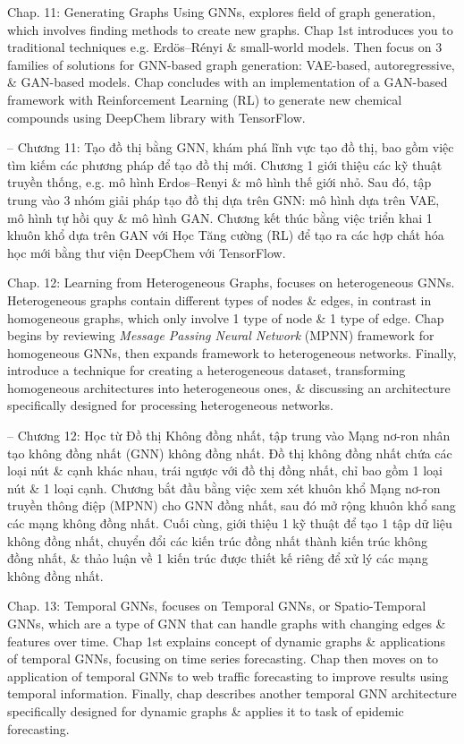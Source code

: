 \documentclass{article}
\begin{document}
\begin{itemize}
\begin{itemize}
        Chap. 11: Generating Graphs Using GNNs, explores field of graph generation, which involves finding methods to create new graphs. Chap 1st introduces you to traditional techniques e.g. Erd\"os--R\'enyi \& small-world models. Then focus on 3 families of solutions for GNN-based graph generation: VAE-based, autoregressive, \& GAN-based models. Chap concludes with an implementation of a GAN-based framework with Reinforcement Learning (RL) to generate new chemical compounds using DeepChem library with TensorFlow.

        -- Chương 11: Tạo đồ thị bằng GNN, khám phá lĩnh vực tạo đồ thị, bao gồm việc tìm kiếm các phương pháp để tạo đồ thị mới. Chương 1 giới thiệu các kỹ thuật truyền thống, e.g. mô hình Erdos--Renyi \& mô hình thế giới nhỏ. Sau đó, tập trung vào 3 nhóm giải pháp tạo đồ thị dựa trên GNN: mô hình dựa trên VAE, mô hình tự hồi quy \& mô hình GAN. Chương kết thúc bằng việc triển khai 1 khuôn khổ dựa trên GAN với Học Tăng cường (RL) để tạo ra các hợp chất hóa học mới bằng thư viện DeepChem với TensorFlow.

        Chap. 12: Learning from Heterogeneous Graphs, focuses on heterogeneous GNNs. Heterogeneous graphs contain different types of nodes \& edges, in contrast in homogeneous graphs, which only involve 1 type of node \& 1 type of edge. Chap begins by reviewing {\it Message Passing Neural Network} (MPNN) framework for homogeneous GNNs, then expands framework to heterogeneous networks. Finally, introduce a technique for creating a heterogeneous dataset, transforming homogeneous architectures into heterogeneous ones, \& discussing an architecture specifically designed for processing heterogeneous networks.

        -- Chương 12: Học từ Đồ thị Không đồng nhất, tập trung vào Mạng nơ-ron nhân tạo không đồng nhất (GNN) không đồng nhất. Đồ thị không đồng nhất chứa các loại nút \& cạnh khác nhau, trái ngược với đồ thị đồng nhất, chỉ bao gồm 1 loại nút \& 1 loại cạnh. Chương bắt đầu bằng việc xem xét khuôn khổ Mạng nơ-ron truyền thông điệp (MPNN) cho GNN đồng nhất, sau đó mở rộng khuôn khổ sang các mạng không đồng nhất. Cuối cùng, giới thiệu 1 kỹ thuật để tạo 1 tập dữ liệu không đồng nhất, chuyển đổi các kiến trúc đồng nhất thành kiến trúc không đồng nhất, \& thảo luận về 1 kiến trúc được thiết kế riêng để xử lý các mạng không đồng nhất.

        Chap. 13: Temporal GNNs, focuses on Temporal GNNs, or Spatio-Temporal GNNs, which are a type of GNN that can handle graphs with changing edges \& features over time. Chap 1st explains concept of dynamic graphs \& applications of temporal GNNs, focusing on time series forecasting. Chap then moves on to application of temporal GNNs to web traffic forecasting to improve results using temporal information. Finally, chap describes another temporal GNN architecture specifically designed for dynamic graphs \& applies it to task of epidemic forecasting.


\end{itemize}
\end{itemize}
\end{document}
